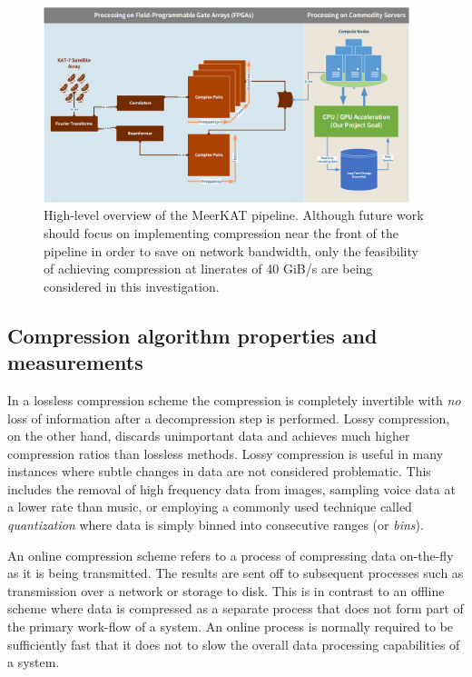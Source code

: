 \begin{figure}[h!]
\begin{mdframed}
 \centering
 \includegraphics[width=0.95\textwidth]{Process.png}
 \caption[MeerKAT data-processing pipeline]{High-level overview of the MeerKAT pipeline. Although future work should focus on implementing compression near the front of the pipeline in order to save on 
 network bandwidth, only the feasibility of achieving compression at linerates of 40 GiB/s are being considered in this investigation.}
 \label{MeerKAT_PIPELINE}
\end{mdframed}
\end{figure}
\subsection{Compression algorithm properties and measurements}
In a lossless compression scheme the compression is completely invertible with \textit{no} loss of information after a decompression step is performed. Lossy
compression, on the other hand, discards unimportant data and achieves much higher compression ratios than lossless methods. Lossy compression is useful in many
instances where subtle changes in data are not considered problematic. This includes the removal of high frequency data from images, sampling 
voice data at a lower rate than music, or employing a commonly used technique called \textit{quantization} where data is simply binned into consecutive ranges 
(or \textit{bins}).

An online compression scheme refers to a process of compressing data on-the-fly as it is being transmitted. The results are sent off to subsequent 
processes such as transmission over a network or storage to disk. This is in contrast to an offline scheme where data is compressed as a separate process that does not
form part of the primary work-flow of a system. An online process is normally required to be sufficiently fast that it does not to slow the overall data processing 
capabilities of a system.

